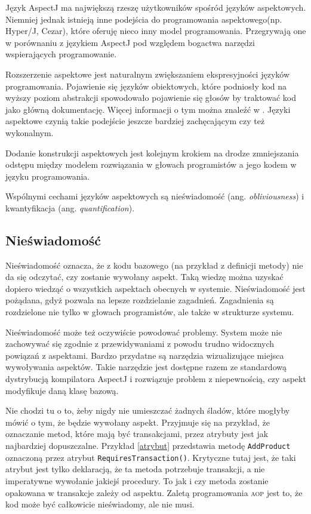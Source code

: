 \documentclass[a4paper,12pt]{mwbk}
\begin{document}
Język AspectJ ma największą rzeszę użytkowników spośród języków aspektowych.
Niemniej jednak istnieją inne podejścia do programowania aspektowego(np.
Hyper/J, Cezar), które oferuję nieco inny model programowania.  Przegrywają one
w porównaniu z językiem AspectJ pod względem bogactwa narzędzi wspierających
programowanie.

Rozszerzenie aspektowe jest naturalnym zwiększaniem ekspresyjności języków
programowania.  Pojawienie się języków obiektowych, które podniosły kod na
wyższy poziom abstrakcji spowodowało pojawienie się głosów by traktować kod
jako główną dokumentację. Więcej informacji o tym można znaleźć w
\cite{CodeAsDesign}. Języki aspektowe czynią takie podejście jeszcze bardziej
zachęcającym czy też wykonalnym. 
         
Dodanie konstrukcji aspektowych jest kolejnym krokiem na drodze zmniejszania
odstępu między modelem rozwiązania w głowach programistów a jego kodem w języku
programowania.

Wspólnymi cechami języków aspektowych są nieświadomość (ang.
\emph{obliviousness}) i kwantyfikacja (ang. \emph{quantification}).


\subsection{Nieświadomość}

Nieświadomość oznacza, że z kodu bazowego (na przykład z definicji metody) nie
da się odczytać, czy zostanie wywołany aspekt. Taką wiedzę można uzyskać
dopiero wiedząć o wszystkich aspektach obecnych w systemie. Nieświadomość jest
pożądana, gdyż pozwala na lepsze rozdzielanie zagadnień. Zagadnienia są
rozdzielone nie tylko w głowach programistów, ale także w strukturze systemu.

Nieświadomość może też oczywiście powodować problemy. System może nie
zachowywać się zgodnie z przewidywaniami z powodu trudno widocznych powiązań z
aspektami. Bardzo przydatne są narzędzia wizualizujące miejsca wywoływania
aspektów. Takie narzędzie jest dostępne razem ze standardową dystrybucją
kompilatora AspectJ i rozwiązuje problem z niepewnością, czy aspekt modyfikuje
daną klasę bazową.

Nie chodzi tu o to, żeby nigdy nie umieszczać żadnych śladów, które mogłyby
mówić o tym, że będzie wywołany aspekt. Przyjmuje się na przykład, że
oznaczanie metod, które mają być transakcjami, przez atrybuty jest jak
najbardziej dopuszczalne. Przykład \ref{atrybut} przedstawia metodę
\lstinline!AddProduct! oznaczoną przez atrybut
\lstinline!RequiresTransaction()!.  Krytyczne tutaj jest, że taki atrybut jest
tylko deklaracją, że ta metoda potrzebuje transakcji, a nie imperatywne
wywołanie jakiejś procedury. To jak i czy metoda zostanie opakowana w
transakcje zależy od aspektu. Zaletą programowania \textsc{aop} jest to, że kod
może być całkowicie nieświadomy, ale nie musi.
\end{document}
